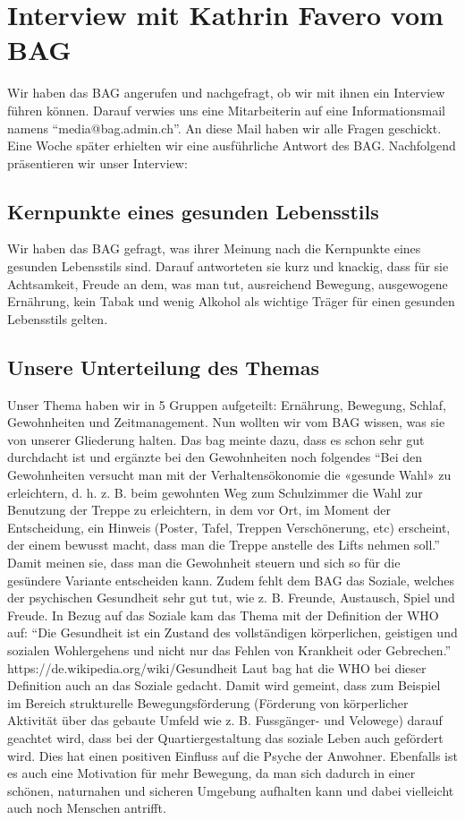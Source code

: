 \chapter{Interview mit Kathrin Favero vom BAG}
\authortoc{\bastian}{\chapterident}
Wir haben das BAG angerufen und nachgefragt, ob wir mit ihnen ein Interview führen können. Darauf verwies uns eine Mitarbeiterin auf eine Informationsmail namens “media@bag.admin.ch”. An diese Mail haben wir alle Fragen geschickt. Eine Woche später erhielten wir eine ausführliche Antwort des BAG. Nachfolgend präsentieren wir unser Interview:
\section{Kernpunkte eines gesunden Lebensstils}
Wir haben das BAG gefragt, was ihrer Meinung nach die Kernpunkte eines gesunden Lebensstils sind. Darauf antworteten sie kurz und knackig, dass für sie Achtsamkeit, Freude an dem, was man tut, ausreichend Bewegung, ausgewogene
Ernährung, kein Tabak und wenig Alkohol als wichtige Träger für einen gesunden Lebensstils gelten.
\section{Unsere Unterteilung des Themas}
Unser Thema haben wir in 5 Gruppen aufgeteilt: Ernährung, Bewegung, Schlaf, Gewohnheiten und Zeitmanagement. Nun wollten wir vom BAG wissen, was sie von unserer Gliederung halten. Das \acs{bag} meinte dazu, dass es schon sehr gut durchdacht ist und ergänzte bei den Gewohnheiten noch folgendes “Bei den Gewohnheiten versucht man mit der Verhaltensökonomie die «gesunde Wahl» zu erleichtern, d. h. z. B. beim gewohnten Weg zum Schulzimmer die Wahl zur Benutzung der Treppe zu erleichtern, in dem vor Ort, im Moment der Entscheidung, ein Hinweis (Poster, Tafel, Treppen Verschönerung, etc) erscheint, der einem bewusst macht, dass man die Treppe anstelle des Lifts nehmen soll.” Damit meinen sie, dass man die Gewohnheit steuern und sich so für die gesündere Variante entscheiden kann. Zudem fehlt dem BAG das Soziale, welches der psychischen Gesundheit sehr gut tut, wie z. B. Freunde, Austausch, Spiel und Freude.
In Bezug auf das Soziale kam das Thema mit der Definition der WHO auf: “Die Gesundheit ist ein Zustand des vollständigen körperlichen, geistigen und sozialen Wohlergehens und nicht nur das Fehlen von Krankheit oder Gebrechen.” \cite{gesundheit_definition}
https://de.wikipedia.org/wiki/Gesundheit
Laut \acs{bag} hat die WHO bei dieser Definition auch an das Soziale gedacht. Damit wird gemeint, dass zum Beispiel im Bereich strukturelle Bewegungsförderung (Förderung von körperlicher Aktivität über das gebaute Umfeld wie z. B. Fussgänger- und Velowege) darauf geachtet wird, dass bei der Quartiergestaltung das soziale Leben auch gefördert wird. Dies hat einen positiven Einfluss auf die Psyche der Anwohner. Ebenfalls ist es auch eine Motivation für mehr Bewegung, da man sich dadurch in einer schönen, naturnahen und sicheren Umgebung aufhalten kann und dabei vielleicht auch noch Menschen antrifft.
